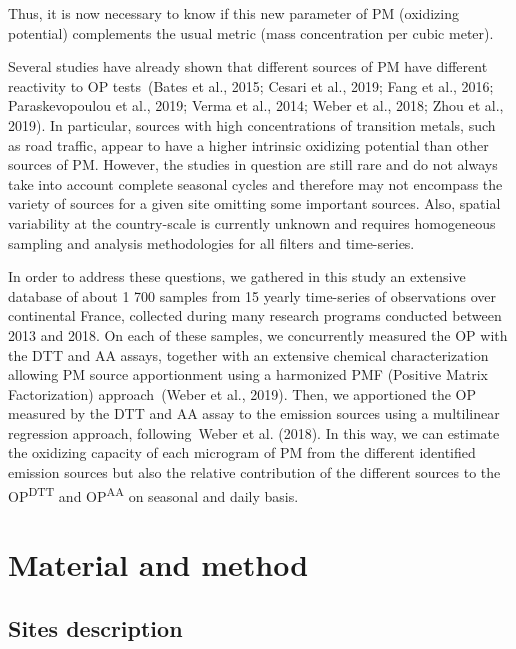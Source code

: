\documentclass[
]{article}
\begin{document}
Thus, it is now necessary to know if this new parameter of PM (oxidizing
potential) complements the usual metric (mass concentration per cubic
meter).

Several studies have already shown that different sources of PM have
different reactivity to OP tests~(Bates et al., 2015; Cesari et al.,
2019; Fang et al., 2016; Paraskevopoulou et al., 2019; Verma et al.,
2014; Weber et al., 2018; Zhou et al., 2019). In particular, sources
with high concentrations of transition metals, such as road traffic,
appear to have a higher intrinsic oxidizing potential than other sources
of PM. However, the studies in question are still rare and do not always
take into account complete seasonal cycles and therefore may not
encompass the variety of sources for a given site omitting some
important sources. Also, spatial variability at the country-scale is
currently unknown and requires homogeneous sampling and analysis
methodologies for all filters and time-series.

In order to address these questions, we gathered in this study an
extensive database of about 1 700 samples from 15 yearly time-series of
observations over continental France, collected during many research
programs conducted between 2013 and 2018. On each of these samples, we
concurrently measured the OP with the DTT and AA assays, together with
an extensive chemical characterization allowing PM source apportionment
using a harmonized PMF (Positive Matrix Factorization) approach~(Weber
et al., 2019). Then, we apportioned the OP measured by the DTT and AA
assay to the emission sources using a multilinear regression approach,
following~Weber et al. (2018). In this way, we can estimate the
oxidizing capacity of each microgram of PM from the different identified
emission sources but also the relative contribution of the different
sources to the OP\textsuperscript{DTT} and OP\textsuperscript{AA} on
seasonal and daily basis.

\hypertarget{material-and-method}{%
\section{Material and method}\label{material-and-method}}

\hypertarget{sites-description}{%
\subsection{Sites description}\label{sites-description}}
\end{document}
